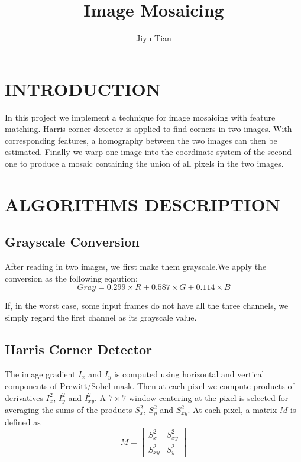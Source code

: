 \documentclass[letterpaper, 10 pt, conference]{ieeeconf}
\title{\Huge Image Mosaicing}
\author{Jiyu Tian}
\begin{document}
\maketitle
\thispagestyle{empty}
\pagestyle{empty}


\section{INTRODUCTION}
In this project we implement a technique for image mosaicing with feature matching. 
Harris corner detector is applied to find corners in two images. With corresponding features, a homography between the two images can then be estimated. Finally we warp one image into the coordinate system of the second one to produce a mosaic containing the union of all pixels in the two images.
\section{ALGORITHMS DESCRIPTION}
\subsection{Grayscale Conversion}
After reading in two images, we first make them grayscale.We apply the conversion as the following eqaution:
\begin{equation}
Gray = 0.299 \times R + 0.587 \times G + 0.114 \times B
\end{equation}

If, in the worst case, some input frames do not have all the three channels, we simply regard the first channel as its grayscale value.
\subsection{Harris Corner Detector}
The image gradient $I_x$ and $I_y$ is computed using horizontal and vertical components of Prewitt/Sobel mask. Then at each pixel we compute products of derivatives $I^2_x$, $I^2_y$ and $I^2_{xy}$. A $7\times7$ window centering at the pixel is selected for averaging the sums of the products $S^2_x$, $S^2_y$ and $S^2_{xy}$.
At each pixel, a matrix $M$ is defined as 
\begin{equation}
M=\left[ \begin{array}{cc}
S^2_x & S^2_{xy}\\
S^2_{xy} & S^2_y
\end{array} \right]
\end{equation}
\end{document}
